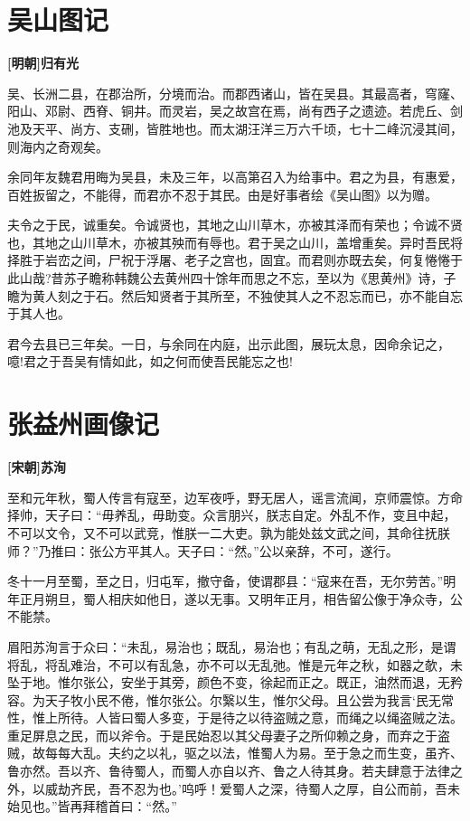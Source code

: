 \documentclass[UTF8,titlepage,oneside]{ctexbook}
\begin{document}
\chapter*{吴山图记}
\begin{center}
	\textbf{[明朝]归有光}
\end{center}


吴、长洲二县，在郡治所，分境而治。而郡西诸山，皆在吴县。其最高者，穹窿、阳山、邓尉、西脊、铜井。而灵岩，吴之故宫在焉，尚有西子之遗迹。若虎丘、剑池及天平、尚方、支硎，皆胜地也。而太湖汪洋三万六千顷，七十二峰沉浸其间，则海内之奇观矣。


余同年友魏君用晦为吴县，未及三年，以高第召入为给事中。君之为县，有惠爱，百姓扳留之，不能得，而君亦不忍于其民。由是好事者绘《吴山图》以为赠。


夫令之于民，诚重矣。令诚贤也，其地之山川草木，亦被其泽而有荣也；令诚不贤也，其地之山川草木，亦被其殃而有辱也。君于吴之山川，盖增重矣。异时吾民将择胜于岩峦之间，尸祝于浮屠、老子之宫也，固宜。而君则亦既去矣，何复惓惓于此山哉?昔苏子瞻称韩魏公去黄州四十馀年而思之不忘，至以为《思黄州》诗，子瞻为黄人刻之于石。然后知贤者于其所至，不独使其人之不忍忘而已，亦不能自忘于其人也。


君今去县已三年矣。一日，与余同在内庭，出示此图，展玩太息，因命余记之，噫!君之于吾吴有情如此，如之何而使吾民能忘之也!


\chapter*{张益州画像记}
\begin{center}
	\textbf{[宋朝]苏洵}
\end{center}


至和元年秋，蜀人传言有寇至，边军夜呼，野无居人，谣言流闻，京师震惊。方命择帅，天子曰：“毋养乱，毋助变。众言朋兴，朕志自定。外乱不作，变且中起，不可以文令，又不可以武竞，惟朕一二大吏。孰为能处兹文武之间，其命往抚朕师？”乃推曰：张公方平其人。天子曰：“然。”公以亲辞，不可，遂行。


冬十一月至蜀，至之日，归屯军，撤守备，使谓郡县：“寇来在吾，无尔劳苦。”明年正月朔旦，蜀人相庆如他日，遂以无事。又明年正月，相告留公像于净众寺，公不能禁。


眉阳苏洵言于众曰：“未乱，易治也；既乱，易治也；有乱之萌，无乱之形，是谓将乱，将乱难治，不可以有乱急，亦不可以无乱弛。惟是元年之秋，如器之欹，未坠于地。惟尔张公，安坐于其旁，颜色不变，徐起而正之。既正，油然而退，无矜容。为天子牧小民不倦，惟尔张公。尔繄以生，惟尔父母。且公尝为我言‘民无常性，惟上所待。人皆曰蜀人多变，于是待之以待盗贼之意，而绳之以绳盗贼之法。重足屏息之民，而以斧令。于是民始忍以其父母妻子之所仰赖之身，而弃之于盗贼，故每每大乱。夫约之以礼，驱之以法，惟蜀人为易。至于急之而生变，虽齐、鲁亦然。吾以齐、鲁待蜀人，而蜀人亦自以齐、鲁之人待其身。若夫肆意于法律之外，以威劫齐民，吾不忍为也。’呜呼！爱蜀人之深，待蜀人之厚，自公而前，吾未始见也。”皆再拜稽首曰：“然。”
\end{document}
